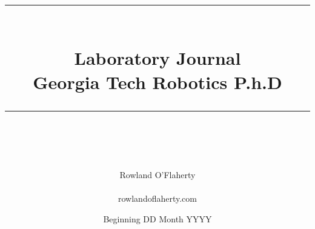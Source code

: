 \documentclass[idxtotoc,hyperref,openany,oneside]{labbook} %
\newcommand{\HRule}{\rule{\linewidth}{0.5mm}} %
\begin{document}

\frontmatter %
\title{
\begin{center}
\HRule \\[0.4cm]
{\Huge \bfseries Laboratory Journal \\[0.5cm] \Large Georgia Tech Robotics P.h.D}\\[0.4cm] %
\HRule \\[1.5cm]
\end{center}
}
\author{\Huge Rowland O'Flaherty \\ \\ \LARGE rowlandoflaherty.com \\[2cm]}
\date{Beginning DD Month YYYY} %
\maketitle

\tableofcontents

\mainmatter %





\end{document}

